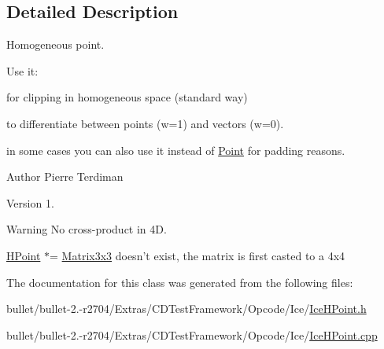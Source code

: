 \subsection{Detailed Description}
Homogeneous point.

Use it\+:
\begin{DoxyItemize}
\item for clipping in homogeneous space (standard way)
\item to differentiate between points (w=1) and vectors (w=0).
\item in some cases you can also use it instead of \hyperlink{class_point}{Point} for padding reasons.
\end{DoxyItemize}

\begin{DoxyAuthor}{Author}
Pierre Terdiman 
\end{DoxyAuthor}
\begin{DoxyVersion}{Version}
1. 
\end{DoxyVersion}
\begin{DoxyWarning}{Warning}
No cross-\/product in 4\+D. 

\hyperlink{class_h_point}{H\+Point} $\ast$= \hyperlink{class_matrix3x3}{Matrix3x3} doesn't exist, the matrix is first casted to a 4x4 
\end{DoxyWarning}


The documentation for this class was generated from the following files\+:\begin{DoxyCompactItemize}
\item 
bullet/bullet-\/2.-\/r2704/\+Extras/\+C\+D\+Test\+Framework/\+Opcode/\+Ice/\hyperlink{_ice_h_point_8h}{Ice\+H\+Point.\+h}\item 
bullet/bullet-\/2.-\/r2704/\+Extras/\+C\+D\+Test\+Framework/\+Opcode/\+Ice/\hyperlink{_ice_h_point_8cpp}{Ice\+H\+Point.\+cpp}\end{DoxyCompactItemize}
